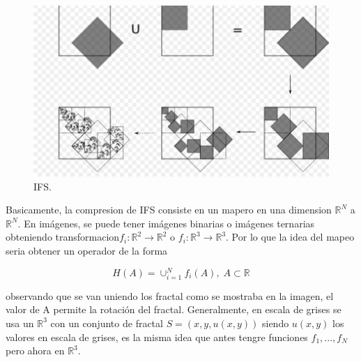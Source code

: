 \begin{figure}[H]
	\centering
	\includegraphics[scale=0.5]{imagenes/IFS.png}

	\caption{IFS\label{fig:IFS}.}
\end{figure} 

Basicamente, la compresion de IFS consiste en un mapero en una dimension $\mathbb{R}^N$ a $\mathbb{R}^N$. En imágenes, se puede tener imágenes binarias o imágenes ternarias obteniendo transformacion$f_i:\mathbb{R}^2\longrightarrow\mathbb{R}^2$ o $f_i:\mathbb{R}^3\longrightarrow\mathbb{R}^3$. Por lo que la idea del mapeo seria obtener un operador de la forma

\begin{equation}
H(A)=\cup^N_{i=1}f_i(A),\;A\subset\mathbb{R}
\end{equation}

observando que se van uniendo los fractal como se mostraba en la imagen, el valor de A permite la rotación del fractal. Generalmente, en escala de grises se usa un $\mathbb{R}^3$ con un conjunto de fractal $S={(x,y,u(x,y))}$ siendo $u(x,y)$ los valores en escala de grises, es la misma idea que antes tengre funciones $f_1,...,f_N$ pero ahora en $\mathbb{R}^3$.